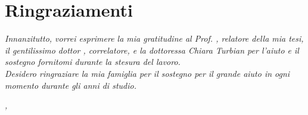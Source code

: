 \cleardoublepage
{}
{}

\begingroup
\let\clearpage\relax
\let\cleardoublepage\relax
\let\cleardoublepage\relax

\chapter*{Ringraziamenti}

\noindent \textit{Innanzitutto, vorrei esprimere la mia gratitudine al Prof. \myProf, relatore della mia tesi, il gentilissimo dottor \myTutor, correlatore, e la dottoressa Chiara Turbian per l'aiuto e il sostegno fornitomi durante la stesura del lavoro.}\\

\noindent \textit{Desidero ringraziare la mia famiglia per il sostegno per il grande aiuto in ogni momento durante gli anni di studio.}\\

\bigskip

\noindent\textit{\myLocation, \myTime}
\hfill \myName

\endgroup
